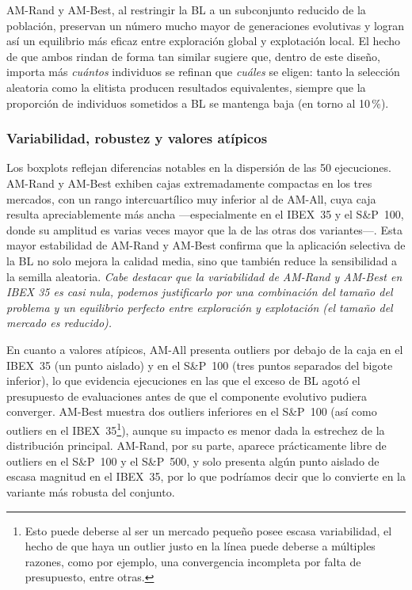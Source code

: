 AM-Rand y AM-Best, al restringir la BL a un subconjunto reducido de la población, preservan un número mucho mayor de generaciones evolutivas y logran así un equilibrio más eficaz entre exploración global y explotación local. El hecho de que ambos rindan de forma tan similar sugiere que, dentro de este diseño, importa más \textit{cuántos} individuos se refinan que \textit{cuáles} se eligen: tanto la selección aleatoria como la elitista producen resultados equivalentes, siempre que la proporción de individuos sometidos a BL se mantenga baja (en torno al 10\,\%).

\subsubsection*{Variabilidad, robustez y valores atípicos}

Los boxplots reflejan diferencias notables en la dispersión de las 50 ejecuciones. AM-Rand y AM-Best exhiben cajas extremadamente compactas en los tres mercados, con un rango intercuartílico muy inferior al de AM-All, cuya caja resulta apreciablemente más ancha ---especialmente en el IBEX~35 y el S\&P~100, donde su amplitud es varias veces mayor que la de las otras dos variantes---. Esta mayor estabilidad de AM-Rand y AM-Best confirma que la aplicación selectiva de la BL no solo mejora la calidad media, sino que también reduce la sensibilidad a la semilla aleatoria. \textit{Cabe destacar que la variabilidad de AM-Rand y AM-Best en IBEX 35 es casi nula, podemos justificarlo por una combinación del tamaño del problema y un equilibrio perfecto entre exploración y explotación (el tamaño del mercado es reducido).}

En cuanto a valores atípicos, AM-All presenta outliers por debajo de la caja en el IBEX~35 (un punto aislado) y en el S\&P~100 (tres puntos separados del bigote inferior), lo que evidencia ejecuciones en las que el exceso de BL agotó el presupuesto de evaluaciones antes de que el componente evolutivo pudiera converger. AM-Best muestra dos outliers inferiores en el S\&P~100 (así como outliers en el IBEX~35\footnote{Esto puede deberse al ser un mercado pequeño posee escasa variabilidad, el hecho de que haya un outlier justo en la línea puede deberse a múltiples razones, como por ejemplo, una convergencia incompleta por falta de presupuesto, entre otras.}), aunque su impacto es menor dada la estrechez de la distribución principal. AM-Rand, por su parte, aparece prácticamente libre de outliers en el S\&P~100 y el S\&P~500, y solo presenta algún punto aislado de escasa magnitud en el IBEX~35, por lo que podríamos decir que lo convierte en la variante más robusta del conjunto.

